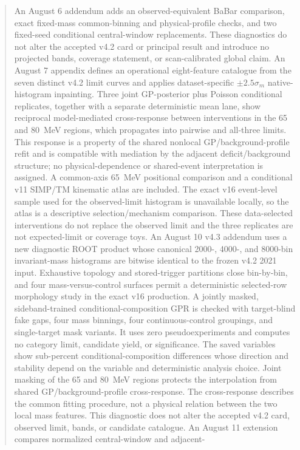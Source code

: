 \documentclass[11pt]{article}
\begin{document}
\begin{abstract}
An August 6 addendum adds an observed-equivalent BaBar comparison, exact
fixed-mass common-binning and physical-profile checks, and two fixed-seed
conditional central-window replacements. These diagnostics do not alter the
accepted v4.2 card or principal result and introduce no projected bands,
coverage statement, or scan-calibrated global claim.
An August 7 appendix defines an operational eight-feature catalogue from the
seven distinct v4.2 limit curves and applies dataset-specific
$\pm2.5\sigma_m$ native-histogram inpainting.  Three joint GP-posterior plus
Poisson conditional replicates, together with a separate deterministic mean
lane, show reciprocal model-mediated cross-response between interventions in
the 65 and 80~MeV regions, which propagates into pairwise and all-three limits.
This response is a property of the shared nonlocal GP/background-profile
refit and is compatible with mediation by the adjacent deficit/background
structure; no physical-dependence or shared-event interpretation is assigned.
A
common-axis 65~MeV positional comparison and a conditional v11
SIMP/TM kinematic atlas are included.  The exact v16 event-level sample used
for the observed-limit histogram is unavailable locally, so the atlas is a
descriptive selection/mechanism comparison.  These
data-selected interventions do not replace the observed limit and the three
replicates are not expected-limit or coverage toys.
An August 10 v4.3 addendum uses a new diagnostic ROOT product whose canonical
2000-, 4000-, and 8000-bin invariant-mass histograms are bitwise identical to
the frozen v4.2 2021 input.  Exhaustive topology and stored-trigger partitions
close bin-by-bin, and four mass-versus-control surfaces permit a deterministic
selected-row morphology study in the exact v16 production.  A jointly masked,
sideband-trained conditional-composition GPR is checked with target-blind fake
gaps, four mass binnings, four continuous-control groupings, and single-target
mask variants.  It uses zero pseudoexperiments and computes no category limit,
candidate yield, or significance.  The saved variables show sub-percent
conditional-composition differences whose direction and stability depend on
the variable and deterministic analysis choice.  Joint masking of the 65 and
80~MeV regions protects the interpolation from shared GP/background-profile
cross-response.  The cross-response describes the common fitting procedure,
not a physical relation between the two local mass features.
This diagnostic does not alter the accepted v4.2 card, observed limit, bands,
or candidate catalogue.
An August 11 extension compares normalized central-window and adjacent-

\end{abstract}
\end{document}
